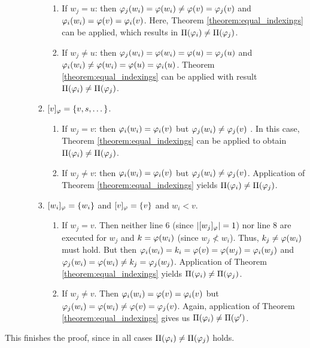 \begin{appendixproof}
\begin{enumerate}
\begin{enumerate}
\begin{enumerate}
                \begin{enumerate}
                    \item If $w_j = u$: then $\varphi_j(w_i) = \varphi(w_i) \neq \varphi(v) = \varphi_j(v)$ and $\varphi_i(w_i) = \varphi(v) = \varphi_i(v)$. Here, Theorem \ref{theorem:equal_indexings} can be applied, which results in $\Pi(\varphi_i) \neq \Pi(\varphi_j)$.
                    \item If $w_j \neq u$: then $\varphi_j(w_i) = \varphi(w_i) = \varphi(u) = \varphi_j(u)$ and $\varphi_i(w_i) \neq \varphi(w_i) = \varphi(u) = \varphi_i(u)$. Theorem \ref{theorem:equal_indexings} can be applied with result $\Pi(\varphi_i) \neq \Pi(\varphi_j)$.
                \end{enumerate}
                \item $[v]_{\varphi} = \{v,s,\dots\}$.
                \begin{enumerate}
                    \item If $w_j = v$: then $\varphi_i(w_i) = \varphi_i(v)$ but $\varphi_j(w_i) \neq \varphi_j(v)$ . In this case, Theorem \ref{theorem:equal_indexings} can be applied to obtain $\Pi(\varphi_i) \neq \Pi(\varphi_j)$.
                    \item If $w_j \neq v$: then $\varphi_i(w_i) = \varphi_i(v)$ but $\varphi_j(w_i) \neq \varphi_j(v)$. Application of Theorem \ref{theorem:equal_indexings} yields $\Pi(\varphi_i) \neq \Pi(\varphi_j)$.
                \end{enumerate}
                \item $[w_i]_\varphi = \{ w_i \}$ and $[v]_\varphi = \{ v \}$ and $w_i < v$.
                \begin{enumerate}
                    \item If $w_j = v$. Then neither line 6 (since $|[w_j]_\varphi| = 1$) nor line 8 are executed for $w_j$ and $k = \varphi(w_i)$ (since $w_j \not < w_i$). Thus, $k_j \neq \varphi(w_i)$ must hold. But then $\varphi_i(w_i) = k_i = \varphi(v) = \varphi(w_j) = \varphi_i(w_j)$ and $\varphi_j(w_i) = \varphi(w_i) \neq k_j = \varphi_j(w_j)$. Application of Theorem \ref{theorem:equal_indexings} yields $\Pi(\varphi_i) \neq \Pi(\varphi_j)$.
                    \item If $w_j \neq v$. Then $\varphi_i(w_i) = \varphi(v) = \varphi_i(v)$ but $\varphi_j(w_i) = \varphi(w_i) \neq \varphi(v) = \varphi_j(v)$. Again, application of Theorem \ref{theorem:equal_indexings} gives us $\Pi(\varphi_i) \neq \Pi(\varphi')$.
                \end{enumerate} 
            \end{enumerate}
        \end{enumerate}
    \end{enumerate}
    This finishes the proof, since in all cases $\Pi(\varphi_i) \neq \Pi(\varphi_j)$ holds.
\end{appendixproof}

